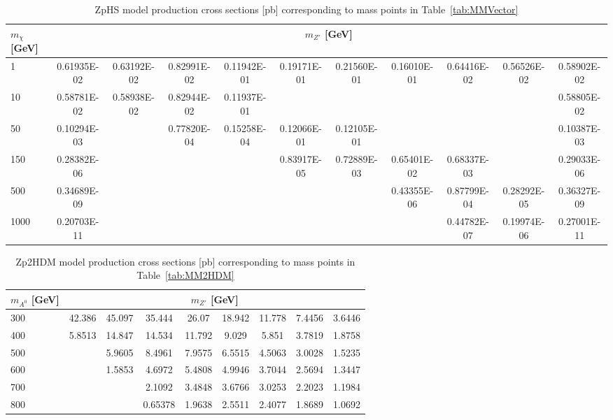 \begin{table}
\begin{center}
\begin{tabular}{l | c | c | c | c | c | c | c | c | c | c}
\hline 
$m_\chi$ [GeV] & \multicolumn{10}{c}{$m_{Z'}$ [GeV]} \\ 
\hline
1 & 0.61935E-02 & 0.63192E-02 & 0.82991E-02 & 0.11942E-01 & 0.19171E-01 & 0.21560E-01 & 0.16010E-01 & 0.64416E-02 & 0.56526E-02 & 0.58902E-02 \\
10 & 0.58781E-02 & 0.58938E-02 & 0.82944E-02 & 0.11937E-01 & & & & & & 0.58805E-02\\
50 & 0.10294E-03 & & 0.77820E-04 & 0.15258E-04  & 0.12066E-01 & 0.12105E-01 & & & & 0.10387E-03 \\
150 & 0.28382E-06 & & & & 0.83917E-05 & 0.72889E-03 & 0.65401E-02 & 0.68337E-03 & & 0.29033E-06 \\
500 & 0.34689E-09 & & & & & & 0.43355E-06 & 0.87799E-04 & 0.28292E-05 & 0.36327E-09 \\
1000 & 0.20703E-11 & & & & & & & 0.44782E-07 & 0.19974E-06 & 0.27001E-11 \\
\hline
\end{tabular}
\caption{ZpHS model production cross sections [pb] corresponding to mass points in Table~\ref{tab:MMVector} \label{tab:zphsxsecs}}
\end{center}
\end{table}

\begin{table}[htbH]
\begin{center}
\begin{tabular}{l | c | c | c | c | c | c | c | c }
\hline 
$m_{A^0}$ [GeV] & \multicolumn{8}{c}{$m_{Z'}$ [GeV]} \\ 
\hline
300 & 42.386 & 45.097 & 35.444 & 26.07 & 18.942 & 11.778 & 7.4456 & 3.6446 \\  
400 & 5.8513 & 14.847 & 14.534 & 11.792 & 9.029 & 5.851 & 3.7819 & 1.8758 \\  
500 & & 5.9605 & 8.4961 & 7.9575 & 6.5515 & 4.5063 & 3.0028 & 1.5235 \\  
600 & & 1.5853 & 4.6972 & 5.4808 & 4.9946 & 3.7044 & 2.5694 & 1.3447 \\
700 & & & 2.1092 & 3.4848 & 3.6766 & 3.0253 & 2.2023 & 1.1984 \\  
800 & & & 0.65378 & 1.9638 & 2.5511 & 2.4077 & 1.8689 & 1.0692 \\  
\hline
\end{tabular}
\caption{Zp2HDM model production cross sections [pb] corresponding to mass points in Table~\ref{tab:MM2HDM} \label{tab:zp2hdmxsecs}}
\end{center}
\end{table}

